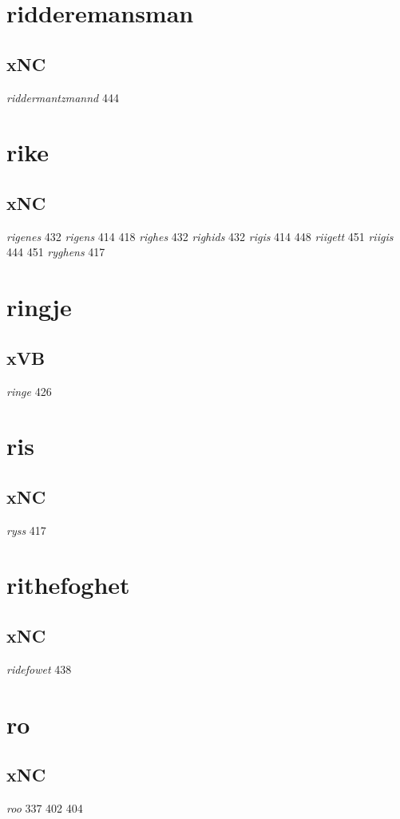 \documentclass[a4paper,twocolumn]{article}
\begin{document}
\section{ridderemansman}
\label{sec:orgc03e2d3}
\subsection{xNC}
\label{sec:org76ad2a4}
\emph{riddermantzmannd} 444 
\section{rike}
\label{sec:org8c5289d}
\subsection{xNC}
\label{sec:orgc2c082d}
\emph{rigenes} 432 \emph{rigens} 414 418 \emph{righes} 432 \emph{righids} 432 \emph{rigis} 414 448 \emph{riigett} 451 \emph{riigis} 444 451 \emph{ryghens} 417 
\section{ringje}
\label{sec:orgdf58c38}
\subsection{xVB}
\label{sec:org363a519}
\emph{ringe} 426 
\section{ris}
\label{sec:org55c8dde}
\subsection{xNC}
\label{sec:org30147a9}
\emph{ryss} 417 
\section{rithefoghet}
\label{sec:org5e526f3}
\subsection{xNC}
\label{sec:orge9d2c78}
\emph{ridefowet} 438 
\section{ro}
\label{sec:org9639a38}
\subsection{xNC}
\label{sec:orgcd2e937}
\emph{roo} 337 402 404 
\end{document}
